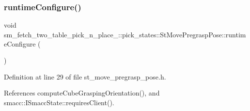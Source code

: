 \subsubsection{\texorpdfstring{runtime\+Configure()}{runtimeConfigure()}}
{\footnotesize\ttfamily void sm\+\_\+fetch\+\_\+two\+\_\+table\+\_\+pick\+\_\+n\+\_\+place\+\_\+::pick\+\_\+states\+::\+St\+Move\+Pregrasp\+Pose\+::runtime\+Configure (\begin{DoxyParamCaption}{ }\end{DoxyParamCaption})\hspace{0.3cm}{\ttfamily [inline]}}



Definition at line 29 of file st\+\_\+move\+\_\+pregrasp\+\_\+pose.\+h.



References compute\+Cube\+Grasping\+Orientation(), and smacc\+::\+I\+Smacc\+State\+::requires\+Client().


